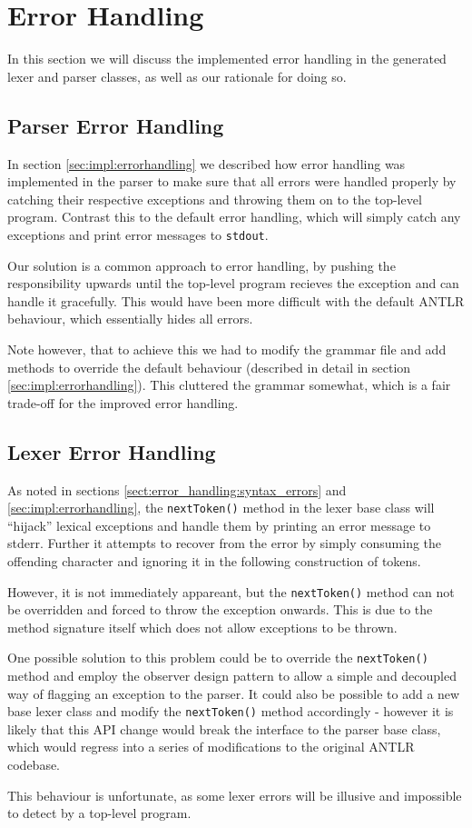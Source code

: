 \section{Error Handling}
\label{sect:discussion:error_handling}
In this section we will discuss the implemented error handling in the generated
lexer and parser classes, as well as our rationale for doing so. 

\subsection{Parser Error Handling}
In section \ref{sec:impl:errorhandling} we described how error handling was
implemented in the parser to make sure that all errors were handled properly by
catching their respective exceptions and throwing them on to the top-level
program. Contrast this to the default error handling, which will simply catch
any exceptions and print error messages to \verb!stdout!.

Our solution is a common approach to error handling, by pushing the
responsibility upwards until the top-level program recieves the exception and
can handle it gracefully. This would have been more difficult with the default
ANTLR behaviour, which essentially hides all errors.

Note however, that to achieve this we had to modify the grammar file and add
methods to override the default behaviour (described in detail in section
\ref{sec:impl:errorhandling}). This cluttered the grammar somewhat, which is a
fair trade-off for the improved error handling.

\subsection{Lexer Error Handling}
\label{sect:future_work:lexer_error_handling} %
As noted in sections \ref{sect:error_handling:syntax_errors} and
\ref{sec:impl:errorhandling}, the \verb!nextToken()! method in the lexer base class
will  ``hijack'' lexical exceptions and handle them by printing an error message
to stderr. Further it attempts to recover from the error by simply consuming the
offending character and ignoring it in the following construction of tokens.

However, it is not immediately appareant, but the \verb!nextToken()! method can
not be overridden and forced to throw the exception onwards. This is due to the method
signature itself which does not allow exceptions to be thrown. 

One possible solution to this problem could be to override the
\verb!nextToken()! method and employ the observer design
pattern\cite{elements_of_oop} to allow a  simple and decoupled way of flagging
an exception to the parser. It could also be possible to add a new base lexer
class and modify the \verb!nextToken()! method accordingly - however it is
likely that this API change would break the interface to the parser base class,
which would regress into a series of modifications to the original ANTLR
codebase. 

This behaviour is unfortunate, as some lexer errors will be illusive and
impossible to detect by a top-level program. 